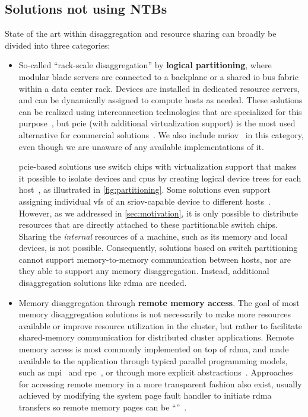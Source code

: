 \subsection{Solutions not using NTBs}
State of the art within \gls{disaggregation} and resource sharing can broadly be divided into three categories:
%
\begin{itemize}
    \item So-called ``rack-scale \gls{disaggregation}'' by \textbf{logical partitioning}, where modular blade servers are connected to a backplane or a shared \gls{io} bus fabric within a data center rack.
        Devices are installed in dedicated resource servers, and can be dynamically assigned to compute hosts as needed.
        These solutions can be realized using interconnection technologies that are specialized for this purpose~\cite{Suzuki2016,Krishnan2006,Shrivastav2019,Katrinis2016}, but
        \gls{pcie} (with additional virtualization support) is the most used alternative for commercial solutions~\cite{url:liqid,url:gigaio,Chung2018,Ravindran2008}.
        We also include \gls{mriov}~\cite{spec:MRIOV} in this category, even though we are unaware of any available implementations of it.

        
        \Gls{pcie}-based solutions use switch chips with virtualization support that makes it possible to isolate devices and \glspl{cpu} by creating logical device trees for each host~\cite{Wong2011,whitepaper:Microsemi,whitepaper:IDT,Chung2018}, as illustrated in \cref{fig:partitioning}.
        Some solutions even support assigning individual \glspl{vf} of an \gls{sriov}-capable device to different hosts~\cite{Chung2018}.
        However, as we addressed in \cref{sec:motivation}, it is only possible to distribute resources that are directly attached to these partitionable switch chips. Sharing the \emph{internal} resources of a machine, such as its memory and local devices, is not possible.
        Consequently, solutions based on switch partitioning cannot support memory-to-memory communication between hosts, nor are they able to support any memory \gls{disaggregation}.
        Instead, additional \gls{disaggregation} solutions like \gls{rdma} are needed.


    \item Memory \gls{disaggregation} through \textbf{remote memory access}.
        The goal of most memory \gls{disaggregation} solutions is not necessarily to make more resources available or improve resource utilization in the cluster, but rather to facilitate shared-memory communication for distributed cluster applications.
        Remote memory access is most commonly implemented on top of \gls{rdma}, and made available to the application through typical parallel programming models, such as \gls{mpi}~\cite{Jiang2004} and \gls{rpc}~\cite{Lu2013}, or through more explicit abstractions~\cite{Aguilera2018}.
        Approaches for accessing remote memory in a more transparent fashion also exist, usually achieved by modifying the system page fault handler to initiate \gls{rdma} transfers so remote memory pages can be ``''~\cite{Liang2005,Gu2017,Lim2009}.
        


\end{itemize}
